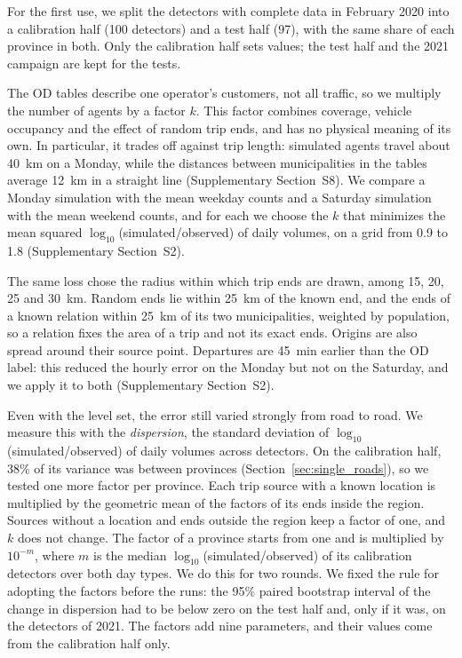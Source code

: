 \documentclass[preprint,11pt,a4paper]{elsarticle}
\begin{document}
For the first use, we split the detectors with complete data in February 2020 into a calibration half (100 detectors) and a test half (97), with the same share of each province in both. Only the calibration half sets values; the test half and the 2021 campaign are kept for the tests.

The OD tables describe one operator's customers, not all traffic, so we multiply the number of agents by a factor $k$. This factor combines coverage, vehicle occupancy and the effect of random trip ends, and has no physical meaning of its own. In particular, it trades off against trip length: simulated agents travel about 40~km on a Monday, while the distances between municipalities in the tables average 12~km in a straight line (Supplementary Section~S8). We compare a Monday simulation with the mean weekday counts and a Saturday simulation with the mean weekend counts, and for each we choose the $k$ that minimizes the mean squared $\log_{10}$(simulated/observed) of daily volumes, on a grid from 0.9 to 1.8 (Supplementary Section~S2).

The same loss chose the radius within which trip ends are drawn, among 15, 20, 25 and 30~km. Random ends lie within 25~km of the known end, and the ends of a known relation within 25~km of its two municipalities, weighted by population, so a relation fixes the area of a trip and not its exact ends. Origins are also spread around their source point. Departures are 45~min earlier than the OD label: this reduced the hourly error on the Monday but not on the Saturday, and we apply it to both (Supplementary Section~S2).

Even with the level set, the error still varied strongly from road to road. We measure this with the \emph{dispersion}, the standard deviation of $\log_{10}$(simulated/observed) of daily volumes across detectors. On the calibration half, 38\% of its variance was between provinces (Section~\ref{sec:single_roads}), so we tested one more factor per province. Each trip source with a known location is multiplied by the geometric mean of the factors of its ends inside the region. Sources without a location and ends outside the region keep a factor of one, and $k$ does not change. The factor of a province starts from one and is multiplied by $10^{-m}$, where $m$ is the median $\log_{10}$(simulated/observed) of its calibration detectors over both day types. We do this for two rounds. We fixed the rule for adopting the factors before the runs: the 95\% paired bootstrap interval of the change in dispersion had to be below zero on the test half and, only if it was, on the detectors of 2021. The factors add nine parameters, and their values come from the calibration half only.
\end{document}
